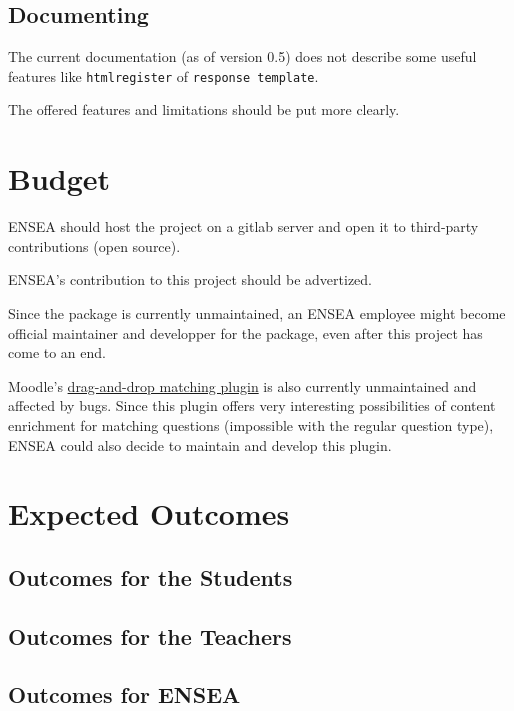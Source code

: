 \documentclass[twocolumn,a4paper,9pt]{article}
\begin{document}
\subsection{Documenting}

The current documentation (as of version 0.5) does not describe some useful 
features like \texttt{htmlregister} of \texttt{response template}.

The offered features and limitations should be put more clearly.

\section{Budget}

ENSEA should host the project on a gitlab server and open it to third-party 
contributions (open source).

ENSEA's contribution to this project should be advertized.

Since the package is currently unmaintained, an ENSEA employee might become 
official maintainer and developper for the package, even after this project has 
come to an end.

Moodle's \href{https://github.com/jmvedrine/moodle-qtype_ddmatch}{drag-and-drop 
matching plugin} is also currently unmaintained and 
affected by bugs. Since this plugin offers very interesting possibilities of 
content enrichment for matching questions (impossible with the regular question 
type), ENSEA could also decide to maintain and develop this plugin.

\section{Expected Outcomes}

\subsection{Outcomes for the Students}

\subsection{Outcomes for the Teachers}

\subsection{Outcomes for ENSEA}
\end{document}
